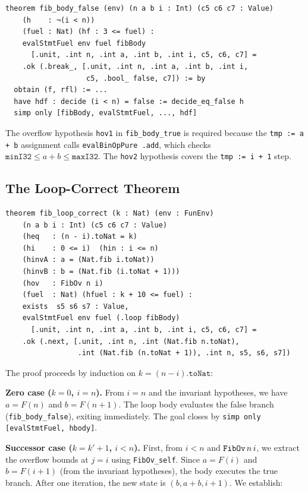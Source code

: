 \begin{lstlisting}[caption={fib\_body\_false: false branch step lemma.},label={lst:fibbf}]
theorem fib_body_false (env) (n a b i : Int) (c5 c6 c7 : Value)
    (h    : ¬(i < n))
    (fuel : Nat) (hf : 3 <= fuel) :
    evalStmtFuel env fuel fibBody
      [.unit, .int n, .int a, .int b, .int i, c5, c6, c7] =
    .ok (.break_, [.unit, .int n, .int a, .int b, .int i,
                   c5, .bool_ false, c7]) := by
  obtain (f, rfl) := ...
  have hdf : decide (i < n) = false := decide_eq_false h
  simp only [fibBody, evalStmtFuel, ..., hdf]
\end{lstlisting}

The overflow hypothesis \texttt{hov1} in \texttt{fib\_body\_true} is required
because the \texttt{tmp := a + b} assignment calls \texttt{evalBinOpPure .add},
which checks $\texttt{minI32} \le a + b \le \texttt{maxI32}$. The \texttt{hov2}
hypothesis covers the \texttt{tmp := i + 1} step.

\subsection{The Loop-Correct Theorem}

\begin{lstlisting}[caption={fib\_loop\_correct: inductive invariant.},label={lst:fiblc}]
theorem fib_loop_correct (k : Nat) (env : FunEnv)
    (n a b i : Int) (c5 c6 c7 : Value)
    (heq   : (n - i).toNat = k)
    (hi    : 0 <= i)  (hin : i <= n)
    (hinvA : a = (Nat.fib i.toNat))
    (hinvB : b = (Nat.fib (i.toNat + 1)))
    (hov   : FibOv n i)
    (fuel  : Nat) (hfuel : k + 10 <= fuel) :
    exists  s5 s6 s7 : Value,
    evalStmtFuel env fuel (.loop fibBody)
      [.unit, .int n, .int a, .int b, .int i, c5, c6, c7] =
    .ok (.next, [.unit, .int n, .int (Nat.fib n.toNat),
                 .int (Nat.fib (n.toNat + 1)), .int n, s5, s6, s7])
\end{lstlisting}

The proof proceeds by induction on $k = (n - i).\texttt{toNat}$:

\textbf{Zero case ($k = 0$, \ie $i = n$).}
From $i = n$ and the invariant hypotheses, we have $a = F(n)$ and
$b = F(n+1)$. The loop body evaluates the false branch (\texttt{fib\_body\_false}),
exiting immediately. The goal closes by \texttt{simp only [evalStmtFuel, hbody]}.

\textbf{Successor case ($k = k'+1$, \ie $i < n$).}
First, from $i < n$ and $\texttt{FibOv}\,n\,i$, we extract the overflow bounds at $j = i$
using \texttt{FibOv\_self}. Since $a = F(i)$ and $b = F(i+1)$ (from the
invariant hypotheses), the body executes the true branch.
After one iteration, the new state is $(b, a+b, i+1)$. We establish:


